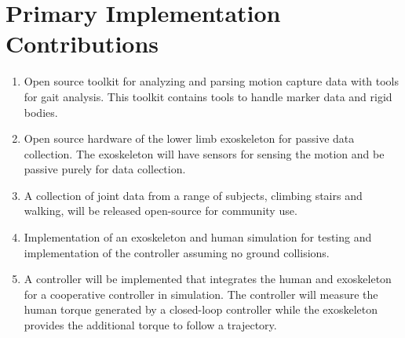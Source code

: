 \section{Primary Implementation Contributions}
\begin{enumerate}[wide, nosep, labelindent = 0pt, topsep = 1ex]
    \item Open source toolkit for analyzing and parsing motion capture data with tools for gait analysis. This toolkit contains tools to handle marker data and rigid bodies.  
    \item Open source hardware of the lower limb exoskeleton for passive data collection. The exoskeleton will have sensors for sensing the motion and be passive purely for data collection.
    \item A collection of joint data from a range of subjects, climbing stairs and walking, will be released open-source for community use.  
    \item Implementation of an exoskeleton and human simulation for testing and implementation of the controller assuming no ground collisions. 
    \item A controller will be implemented that integrates the human and exoskeleton for a cooperative controller in simulation. The controller will measure the human torque generated by a closed-loop controller while the exoskeleton provides the additional torque to follow a trajectory.  
\end{enumerate}